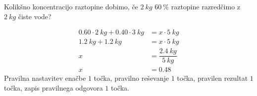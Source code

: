 \documentclass[addpoints]{exam}
\begin{document}
\begin{questions}


\newpage
        \question[4]
        Kolikšno koncentracijo raztopine dobimo, če $2~kg$ $60~\%$ raztopine razredčimo z $2~kg$ čiste vode?

        \begin{solution}[8cm]
            \begin{align*}
                0.60 \cdot 2~kg + 0.40\cdot 3~kg &= x \cdot 5~kg \\
                                 1.2~kg+1.2~kg &= x\cdot 5~kg \\
                                            x &= \dfrac{2.4~kg}{5~kg} \\
                                            x &= 0.48
            \end{align*}
            Pravilna nastavitev enačbe $1$ točka, pravilno reševanje $1$ točka, pravilen rezultat $1$ točka, zapis pravilnega odgovora $1$ točka.
        \end{solution}






\end{questions}
\end{document}
